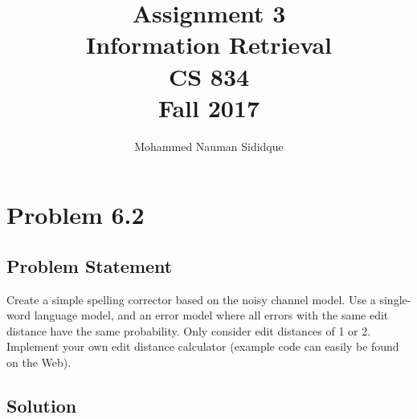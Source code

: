 \documentclass[12pt]{report}
\author{Mohammed Nauman Sididque}
\title{Assignment 3 \\Information Retrieval \\ CS 834 \\ Fall 2017 }
\begin{document}
\maketitle
\tableofcontents
\chapter{Problem 6.2}
\section{Problem Statement}
Create a simple spelling corrector based on the noisy channel model. Use a single-word language model, and an error model where all errors with the same edit distance have the same probability. Only consider edit distances of 1 or 2. Implement your own edit distance calculator (example code can easily be found on the Web).
\section{Solution}
\end{document}
